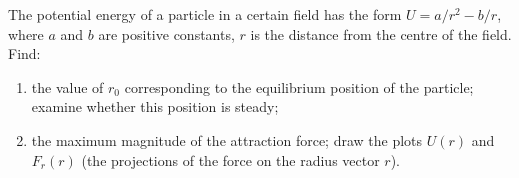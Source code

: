\item The potential energy of a particle in a certain field has the form \( U = a/r^2 - b/r \), where \( a \) and \( b \) are positive constants, \( r \) is the distance from the centre of the field. Find:
    \begin{enumerate}
        \item the value of \( r_0 \) corresponding to the equilibrium position of the particle; examine whether this position is steady;
        \item the maximum magnitude of the attraction force; draw the plots \( U(r) \) and \( F_r(r) \) (the projections of the force on the radius vector \( r \)).
    \end{enumerate}
\begin{solution}
    \begin{center}
    \end{center}
    
\end{solution}
